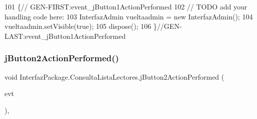 \begin{DoxyCode}
101                                                                          \{\textcolor{comment}{//
      GEN-FIRST:event\_jButton1ActionPerformed}
102         \textcolor{comment}{// TODO add your handling code here:}
103         InterfazAdmin vueltaadmin = \textcolor{keyword}{new} InterfazAdmin();
104         vueltaadmin.setVisible(\textcolor{keyword}{true});
105         dispose();
106     \}\textcolor{comment}{//GEN-LAST:event\_jButton1ActionPerformed}
\end{DoxyCode}
\mbox{\label{class_interfaz_package_1_1_consulta_lista_lectores_ac0dc90c31a97f36fc10ea54c3d0c6a55}} 
\subsubsection{\texorpdfstring{j\+Button2\+Action\+Performed()}{jButton2ActionPerformed()}}
{\footnotesize\ttfamily void Interfaz\+Package.\+Consulta\+Lista\+Lectores.\+j\+Button2\+Action\+Performed (\begin{DoxyParamCaption}\item[{java.\+awt.\+event.\+Action\+Event}]{evt }\end{DoxyParamCaption})\hspace{0.3cm}{\ttfamily [inline]}, {\ttfamily [private]}}


